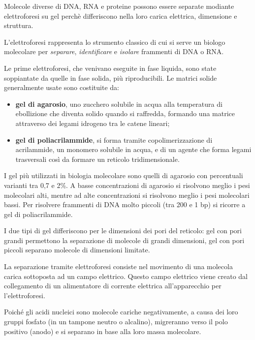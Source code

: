 \documentclass[11pt]{book}
\begin{document}
Molecole diverse di DNA, RNA e proteine possono essere separate modiante
elettroforesi su gel perchè differiscono nella loro carica elettrica,
dimensione e struttura.

L'elettroforesi rappresenta lo strumento classico di cui si serve un
biologo molecolare per \emph{separare}, \emph{identificare} e
\emph{isolare} frammenti di DNA o RNA.

Le prime elettroforesi, che venivano eseguite in fase liquida, sono
state soppiantate da quelle in fase solida, più riproducibili. Le
matrici solide generalmente usate sono costituite da:

\begin{itemize}
\itemsep1pt\parskip0pt
\item
  \textbf{gel di agarosio}, uno zucchero solubile in acqua alla
  temperatura di ebollizione che diventa solido quando si raffredda,
  formando una matrice attraverso dei legami idrogeno tra le catene
  lineari;
\item
  \textbf{gel di poliacrilammide}, si forma tramite copolimerizzazione
  di acrilammide, un monomero solubile in acqua, e di un agente che
  forma legami trasversali così da formare un reticolo tridimensionale.
\end{itemize}

I gel più utilizzati in biologia molecolare sono quelli di agarosio con
percentuali varianti tra 0,7 e 2\%. A basse concentrazioni di agarosio
si risolvono meglio i pesi molecolari alti, mentre ad alte
concentrazioni si risolvono meglio i pesi molecolari bassi. Per
risolvere frammenti di DNA molto piccoli (tra 200 e 1 bp) si ricorre a
gel di poliacrilammide.

I due tipi di gel differiscono per le dimensioni dei pori del reticolo:
gel con pori grandi permettono la separazione di molecole di grandi
dimensioni, gel con pori piccoli separano molecole di dimensioni
limitate.

La separazione tramite elettroforesi consiste nel movimento di una
molecola carica sottoposta ad un campo elettrico. Questo campo elettrico
viene creato dal collegamento di un alimentatore di corrente elettrica
all'apparecchio per l'elettroforesi.

Poiché gli acidi nucleici sono molecole cariche negativamente, a causa
dei loro gruppi fosfato (in un tampone neutro o alcalino), migreranno
verso il polo positivo (anodo) e si separano in base alla loro massa
molecolare.
\end{document}
